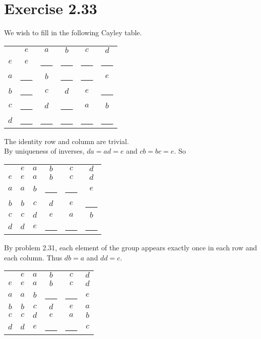 \documentclass{article}
\begin{document}
\section*{Exercise 2.33}
We wish to fill in the following Cayley table.
\begin{center}
    \begin{tabular}{c | c c c c c}
        & $e$ & $a$ & $b$ & $c$ & $d$  \\
       \cline{1-6}
       $e$ & $e$         & \ul{\ \ \ } & \ul{\ \ \ } & \ul{\ \ \ } & \ul{\ \ \ } \\
       $a$ & \ul{\ \ \ } & $b$         & \ul{\ \ \ } & \ul{\ \ \ } & $e$ \\
       $b$ & \ul{\ \ \ } & $c$         & $d$         & $e$         & \ul{\ \ \ } \\
       $c$ & \ul{\ \ \ } & $d$         & \ul{\ \ \ } & $a$         & $b$ \\
       $d$ & \ul{\ \ \ } & \ul{\ \ \ } & \ul{\ \ \ } & \ul{\ \ \ } & \ul{\ \ \ } \\
   \end{tabular}
\end{center}
The identity row and column are trivial. \\
By uniqueness of inverses, \(da=ad=e\) and \(cb=bc=e\). So
\begin{center}
    \begin{tabular}{c | c c c c c}
        & $e$ & $a$ & $b$ & $c$ & $d$  \\
       \cline{1-6}
       $e$ & $e$ & $a$ & $b$ & $c$ & $d$ \\
       $a$ & $a$ & $b$         & \ul{\ \ \ } & \ul{\ \ \ } & $e$ \\
       $b$ & $b$ & $c$         & $d$         & $e$         & \ul{\ \ \ } \\
       $c$ & $c$ & $d$         & $e$         & $a$         & $b$ \\
       $d$ & $d$ & $e$ & \ul{\ \ \ } & \ul{\ \ \ } & \ul{\ \ \ } \\
   \end{tabular}
\end{center}
By problem 2.31, each element of the group appears exactly once in each row and each column. Thus \(db=a\) and \(dd=c\).
\begin{center}
    \begin{tabular}{c | c c c c c}
        & $e$ & $a$ & $b$ & $c$ & $d$  \\
       \cline{1-6}
       $e$ & $e$ & $a$ & $b$ & $c$ & $d$ \\
       $a$ & $a$ & $b$         & \ul{\ \ \ } & \ul{\ \ \ } & $e$ \\
       $b$ & $b$ & $c$ & $d$ & $e$ & $a$ \\
       $c$ & $c$ & $d$ & $e$ & $a$ & $b$ \\
       $d$ & $d$ & $e$ & \ul{\ \ \ } & \ul{\ \ \ } & $c$ \\
   \end{tabular}
\end{center}
\end{document}
